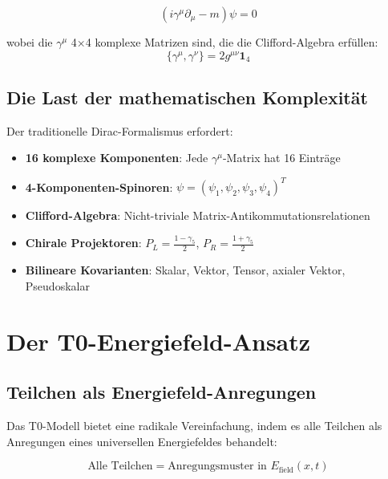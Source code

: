 \documentclass[12pt,a4paper]{report}
\begin{document}
	\begin{equation}
		(i\gamma^\mu \partial_\mu - m)\psi = 0
		\label{eq:dirac_traditional}
	\end{equation}
	
	wobei die $\gamma^\mu$ 4×4 komplexe Matrizen sind, die die Clifford-Algebra erfüllen:
	\begin{equation}
		\{\gamma^\mu, \gamma^\nu\} = 2g^{\mu\nu} \mathbf{1}_4
		\label{eq:clifford_algebra}
	\end{equation}
	
	\subsection{Die Last der mathematischen Komplexität}
	\label{subsec:mathematical_burden}
	
	Der traditionelle Dirac-Formalismus erfordert:
	\begin{itemize}
		\item \textbf{16 komplexe Komponenten}: Jede $\gamma^\mu$-Matrix hat 16 Einträge
		\item \textbf{4-Komponenten-Spinoren}: $\psi = (\psi_1, \psi_2, \psi_3, \psi_4)^T$
		\item \textbf{Clifford-Algebra}: Nicht-triviale Matrix-Antikommutationsrelationen
		\item \textbf{Chirale Projektoren}: $P_L = \frac{1-\gamma_5}{2}$, $P_R = \frac{1+\gamma_5}{2}$
		\item \textbf{Bilineare Kovarianten}: Skalar, Vektor, Tensor, axialer Vektor, Pseudoskalar
	\end{itemize}
	
	\section{Der T0-Energiefeld-Ansatz}
	\label{sec:t0_energy_approach}
	
	\subsection{Teilchen als Energiefeld-Anregungen}
	\label{subsec:energy_field_excitations}
	
	Das T0-Modell bietet eine radikale Vereinfachung, indem es alle Teilchen als Anregungen eines universellen Energiefeldes behandelt:
	
	\begin{equation}
		\boxed{\text{Alle Teilchen} = \text{Anregungsmuster in } E_{\text{field}}(x,t)}
	\end{equation}
	
\end{document}
